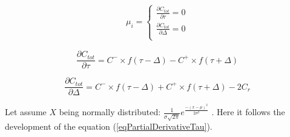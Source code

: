 \begin{equation}
   \begin{split}
   \mu_{i}=\left\{
                \begin{array}{ll}
                  \frac{\partial C_{tot}}{\partial\tau}=0 \\
                  \frac{\partial C_{tot}}{\partial\Delta}=0 \\
                \end{array}
              \right.
   \end{split}
\end{equation}

\begin{equation}
    \frac{\partial C_{tot}}{\partial\tau}=C^{-}\times f(\tau-\Delta)-C^{+}\times f(\tau+\Delta)
    \label{eqPartialDerivativeTau}
\end{equation}

\begin{equation}
    \frac{\partial C_{tot}}{\partial\Delta}= C^{-}\times f(\tau- \Delta)+C^{+} \times f(\tau+\Delta)-2C_r
    \label{eqPartialDerivativeDelta}
\end{equation}

Let assume $X$ being normally distributed: $\frac{1}{\sigma\sqrt{2\pi}}e^\frac{-\left(x-\mu\right)^2}{2\sigma^2}$ . Here it follows the development of the equation (\ref{eqPartialDerivativeTau}).

